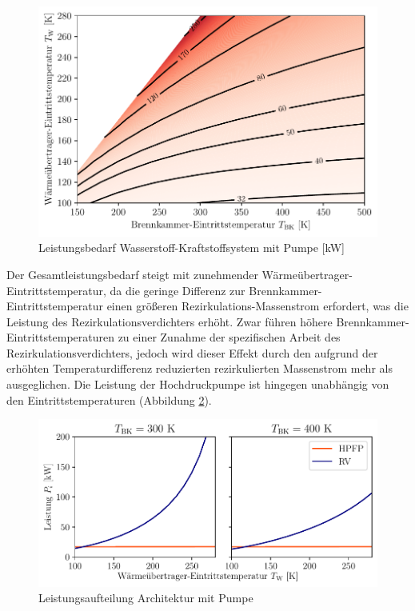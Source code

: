 \begin{figure}[ht]
\centering
\includegraphics[width=0.9\linewidth]{4_Abbildungen/2_Hauptteil/Ergebnisse/Pumpepowercontour.pdf}
  \caption{Leistungsbedarf Wasserstoff-Kraftstoffsystem mit Pumpe [kW]}
  \label{fig:pumppower}
\end{figure}
\FloatBarrier

Der Gesamtleistungsbedarf steigt mit zunehmender Wärmeübertrager-Eintrittstemperatur, da die geringe Differenz zur Brennkammer-Eintrittstemperatur einen größeren Rezirkulations-Massenstrom erfordert, was die Leistung des Rezirkulationsverdichters erhöht. Zwar führen höhere Brennkammer-Eintrittstemperaturen zu einer Zunahme der spezifischen Arbeit des Rezirkulationsverdichters, jedoch wird dieser Effekt durch den aufgrund der erhöhten Temperaturdifferenz reduzierten rezirkulierten Massenstrom mehr als ausgeglichen. Die Leistung der Hochdruckpumpe ist hingegen unabhängig von den Eintrittstemperaturen (Abbildung \ref{fig:pumpsplit}). 

\begin{figure}[ht]
\centering
\includegraphics[width=0.9\linewidth]{4_Abbildungen/2_Hauptteil/Ergebnisse/Pumpe_powersplit.pdf}
  \caption{Leistungsaufteilung Architektur mit Pumpe}
  \label{fig:pumpsplit}
\end{figure}
\FloatBarrier

